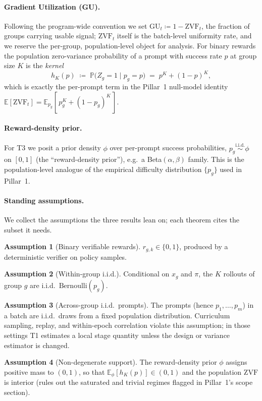 \documentclass[11pt]{article}
\theoremstyle{plain}
\theoremstyle{definition}
\newtheorem{assumption}{Assumption}
\theoremstyle{remark}
\newcommand{\ZVF}{\ensuremath{\mathrm{ZVF}}}
\newcommand{\GU}{\ensuremath{\mathrm{GU}}}
\newcommand{\E}{\mathbb{E}}
\newcommand{\Prob}{\mathbb{P}}
\newcommand{\1}{\mathbb{1}}
\newcommand{\Bern}{\mathrm{Bernoulli}}
\begin{document}
\paragraph{Gradient Utilization (GU).} Following the program-wide convention
we set $\GU_t \coloneqq 1-\ZVF_t$, the fraction of groups carrying usable
signal; $\ZVF_t$ itself is the batch-level uniformity rate, and we reserve
the per-group, population-level object for analysis. For binary rewards the population zero-variance probability of a
prompt with success rate $p$ at group size $K$ is the \emph{kernel}
\begin{equation}\label{eq:kernel}
h_K(p) \;\coloneqq\; \Prob\big(Z_g = 1 \mid p_g=p\big) \;=\; p^{K} + (1-p)^{K},
\end{equation}
which is exactly the per-prompt term in the Pillar~1 null-model identity
$\E[\ZVF_t] = \E_{p_g}[\,p_g^{K} + (1-p_g)^{K}\,]$.

\paragraph{Reward-density prior.} For T3 we posit a prior density $\phi$ over
per-prompt success probabilities, $p_g \overset{\text{i.i.d.}}{\sim}\phi$ on
$[0,1]$ (the ``reward-density prior''), e.g.\ a Beta$(\alpha,\beta)$ family.
This is the population-level analogue of the empirical difficulty distribution
$\{p_g\}$ used in Pillar~1.

\paragraph{Standing assumptions.} We collect the assumptions the three results
lean on; each theorem cites the subset it needs.
\begin{assumption}[Binary verifiable rewards]\label{ass:binary}
$r_{g,k}\in\{0,1\}$, produced by a deterministic verifier on policy samples.
\end{assumption}
\begin{assumption}[Within-group i.i.d.]\label{ass:within-iid}
Conditional on $x_g$ and $\pi$, the $K$ rollouts of group $g$ are i.i.d.\
$\Bern(p_g)$.
\end{assumption}
\begin{assumption}[Across-group i.i.d.\ prompts]\label{ass:across-iid}
The prompts (hence $p_1,\dots,p_m$) in a batch are i.i.d.\ draws from a fixed
population distribution. Curriculum sampling, replay, and within-epoch
correlation violate this assumption; in those settings T1 estimates a local
stage quantity unless the design or variance estimator is changed.
\end{assumption}
\begin{assumption}[Non-degenerate support]\label{ass:nondegen}
The reward-density prior $\phi$ assigns positive mass to $(0,1)$, so that
$\E_\phi[h_K(p)] \in (0,1)$ and the population \ZVF{} is interior (rules out
the saturated and trivial regimes flagged in Pillar~1's scope section).
\end{assumption}
\end{document}
